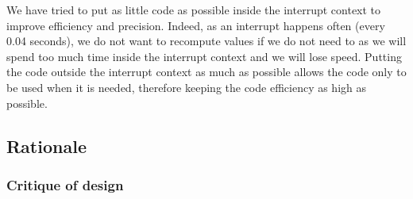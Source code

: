 \documentclass{article}
\renewcommand{\_}{\char`_}
\begin{document}
We have tried to put as little code as possible inside the interrupt context to improve efficiency and precision. Indeed, as an interrupt happens often (every 0.04 seconds), we do not want to recompute values if we do not need to as we will spend too much time inside the interrupt context and we will lose speed. Putting the code outside the interrupt context as much as possible allows the code only to be used when it is needed, therefore keeping the code efficiency as high as possible. 


\subsection{Rationale}
\subsubsection{Critique of design}
\end{document}
